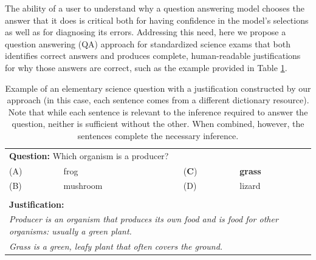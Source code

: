 
The ability of a user to understand why a question answering model chooses the answer that it does is critical both for having confidence in the model's selections as well as for diagnosing its errors.  Addressing this need, here we propose a question answering (QA) approach for standardized science exams that both identifies correct answers and produces complete, human-readable justifications for why those answers are correct, such as the example provided in Table \ref{tab:question_and_justification}. 


\begin{table}[t]
\begin{center}
\begin{tabularx}{0.8\linewidth}{p{0.5cm}p{2cm}p{0.5cm}p{2cm}}
\multicolumn{4}{p{10cm}}{\textbf{Question:} Which organism is a producer?} \\
 (A) & frog & (\textbf{C}) & \textbf{grass} \\
 (B) & mushroom &   (D) & lizard \\
 \\
\multicolumn{4}{p{10cm}}{\textbf{Justification:} }\\
\multicolumn{4}{p{10cm}}{\textit{Producer is an organism that produces its own food and is food for other organisms: usually a green plant.}} \\
\multicolumn{4}{p{15cm}}{\textit{Grass is a green, leafy plant that often covers the ground.}} \\

\end{tabularx}
\caption{{  Example of an elementary science question with a  justification constructed by our approach (in this case, each sentence comes from a different dictionary resource). Note that while each sentence is relevant to the inference required to answer the question, neither is sufficient without the other.  When combined, however, the sentences complete the necessary inference. }}

\label{tab:question_and_justification}
\end{center}
\end{table}

